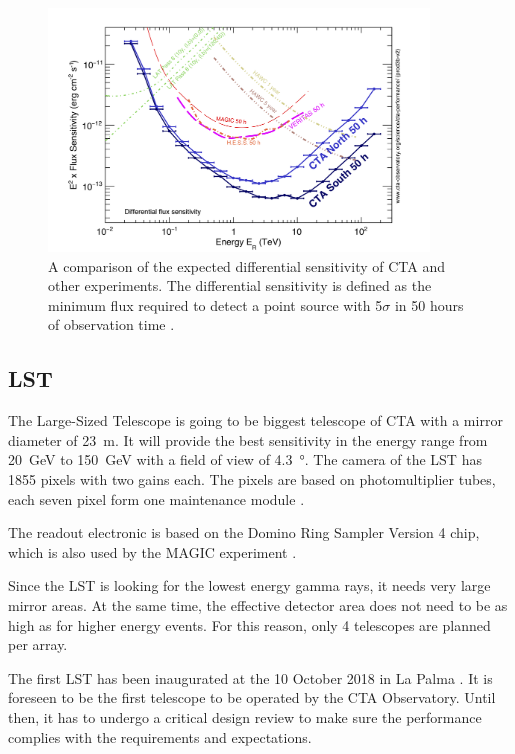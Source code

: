 \begin{figure}[H]
	\center
	\captionsetup{width=0.9\linewidth}
	\includegraphics[width=0.9\textwidth]{images/cta_performance.png}
	\caption{A comparison of the expected differential sensitivity of CTA and
	other experiments. The differential sensitivity is defined as the
	minimum flux required to detect a point source with 5$\sigma$ 
	in 50 hours of observation time \cite{cta_web}.}
	\label{fig:cta_performance}
\end{figure}


\subsection{LST}
\label{sec:lst}
The Large-Sized Telescope is going to be biggest telescope of CTA
with a mirror diameter of \SI{23}{\meter}.
It will provide the best sensitivity in the energy range from 
\SI{20}{\giga\electronvolt} to \SI{150}{\giga\electronvolt} with a field of view of \SI{4.3}{\degree}.
The camera of the LST has \num{1855} pixels with two gains each.
The pixels are based on photomultiplier tubes, each seven pixel
form one maintenance module \cite{cta_web}.

The readout electronic is based on the Domino Ring Sampler 
Version 4 chip, which is also used by the MAGIC experiment
\cite{Kubo:2013pwa}. 

Since the LST is looking for the lowest energy gamma rays, it needs
very large mirror areas. At the same time, the effective detector area does 
not need to be as high as for higher energy events.
For this reason, only 4 telescopes are planned per array.

The first LST has been inaugurated at the 10 October 2018 in La Palma \cite{lst_debut}.
It is foreseen to be the first telescope to be operated by the CTA Observatory.
Until then, it has to undergo a critical design review to make sure the performance 
complies with the requirements and expectations.

